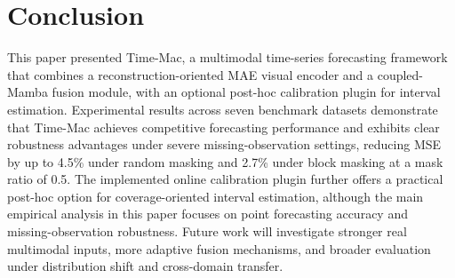 \documentclass[journal]{IEEEtran}
\begin{document}
\section{Conclusion}
This paper presented Time-Mac, a multimodal time-series forecasting framework that combines a reconstruction-oriented MAE visual encoder and a coupled-Mamba fusion module, with an optional post-hoc calibration plugin for interval estimation. Experimental results across seven benchmark datasets demonstrate that Time-Mac achieves competitive forecasting performance and exhibits clear robustness advantages under severe missing-observation settings, reducing MSE by up to 4.5\% under random masking and 2.7\% under block masking at a mask ratio of 0.5. The implemented online calibration plugin further offers a practical post-hoc option for coverage-oriented interval estimation, although the main empirical analysis in this paper focuses on point forecasting accuracy and missing-observation robustness. Future work will investigate stronger real multimodal inputs, more adaptive fusion mechanisms, and broader evaluation under distribution shift and cross-domain transfer.
\newpage


\end{document}
